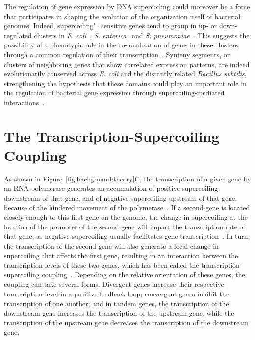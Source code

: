 The regulation of gene expression by DNA supercoiling could moreover be a force that participates in shaping the evolution of the organization itself of bacterial genomes.
Indeed, supercoiling"=sensitive genes tend to group in up- or down-regulated clusters in \emph{E. coli}~\citep{peter2004}, \emph{S. enterica}~\citep{webber2013} and \emph{S. pneumoniae}~\citep{ferrandiz2010}.
This suggests the possibility of a phenotypic role in the co-localization of genes in these clusters, through a common regulation of their transcription~\citep{sobetzko2016}.
Synteny segments, or clusters of neighboring genes that show correlated expression patterns, are indeed evolutionarily conserved across \emph{E. coli} and the distantly related \emph{Bacillus subtilis}, strengthening the hypothesis that these domains could play an important role in the regulation of bacterial gene expression through supercoiling-mediated interactions~\citep{junier2016}.


\section{The Transcription-Supercoiling Coupling}

As shown in Figure~\ref{fig:background:theory}C, the transcription of a given gene by an RNA polymerase generates an accumulation of positive supercoiling downstream of that gene, and of negative supercoiling upstream of that gene, because of the hindered movement of the polymerase~\citep{liu1987,visser2022}.
If a second gene is located closely enough to this first gene on the genome, the change in supercoiling at the location of the promoter of the second gene will impact the transcription rate of that gene, as negative supercoiling usually facilitates gene transcription~\citep{forquet2021}.
In turn, the transcription of the second gene will also generate a local change in supercoiling that affects the first gene, resulting in an interaction between the transcription levels of these two genes, which has been called the transcription-supercoiling coupling~\citep{meyer2014}.
Depending on the relative orientation of these genes, the coupling can take several forms.
Divergent genes increase their respective transcription level in a positive feedback loop; convergent genes inhibit the transcription of one another; and in tandem genes, the transcription of the downstream gene increases the transcription of the upstream gene, while the transcription of the upstream gene decreases the transcription of the downstream gene.

